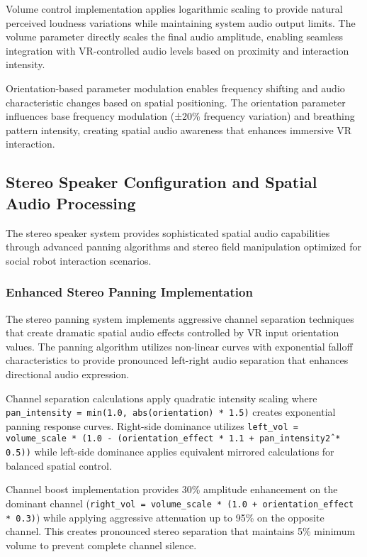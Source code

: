 Volume control implementation applies logarithmic scaling to provide natural perceived loudness variations while maintaining system audio output limits. The volume parameter directly scales the final audio amplitude, enabling seamless integration with VR-controlled audio levels based on proximity and interaction intensity.

Orientation-based parameter modulation enables frequency shifting and audio characteristic changes based on spatial positioning. The orientation parameter influences base frequency modulation (±20\% frequency variation) and breathing pattern intensity, creating spatial audio awareness that enhances immersive VR interaction.

\subsection{Stereo Speaker Configuration and Spatial Audio Processing}

The stereo speaker system provides sophisticated spatial audio capabilities through advanced panning algorithms and stereo field manipulation optimized for social robot interaction scenarios.

\subsubsection{Enhanced Stereo Panning Implementation}

The stereo panning system implements aggressive channel separation techniques that create dramatic spatial audio effects controlled by VR input orientation values. The panning algorithm utilizes non-linear curves with exponential falloff characteristics to provide pronounced left-right audio separation that enhances directional audio expression.

Channel separation calculations apply quadratic intensity scaling where \texttt{pan\_intensity = min(1.0, abs(orientation) * 1.5)} creates exponential panning response curves. Right-side dominance utilizes \texttt{left\_vol = volume\_scale * (1.0 - (orientation\_effect * 1.1 + pan\_intensity\^2 * 0.5))} while left-side dominance applies equivalent mirrored calculations for balanced spatial control.

Channel boost implementation provides 30\% amplitude enhancement on the dominant channel (\texttt{right\_vol = volume\_scale * (1.0 + orientation\_effect * 0.3)}) while applying aggressive attenuation up to 95\% on the opposite channel. This creates pronounced stereo separation that maintains 5\% minimum volume to prevent complete channel silence.

